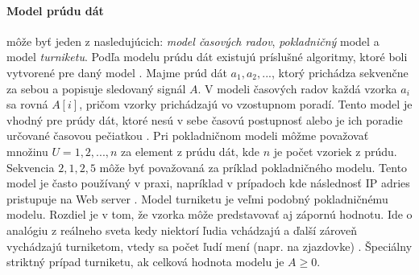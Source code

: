 \paragraph{Model prúdu dát} môže byť jeden z nasledujúcich: \textit{model časových radov}, \textit{pokladničný} model a model \textit{turniketu}. Podľa modelu prúdu dát existujú príslušné algoritmy, ktoré boli vytvorené pre daný model \citep{tran2014change}. Majme prúd dát $a_1, a_2, ...$, ktorý prichádza sekvenčne za sebou a popisuje sledovaný signál $A$. 
V modeli časových radov každá vzorka $a_i$ sa rovná $A[i]$, pričom vzorky prichádzajú vo vzostupnom poradí. Tento model je vhodný pre prúdy dát, ktoré nesú v sebe časovú postupnosť alebo je ich poradie určované časovou pečiatkou \citep{muthukrishnan2005data}.
Pri pokladničnom modeli môžme považovať množinu $U = {1, 2, ..., n}$ za element z prúdu dát, kde $n$ je počet vzoriek z prúdu. Sekvencia $2, 1, 2, 5$ môže byť považovaná za príklad pokladničného modelu. Tento model je často používaný v praxi, napríklad v prípadoch kde následnosť IP adries pristupuje na Web server \citep{ikonomovska2013algorithmic, muthukrishnan2005data}.
Model turniketu je veľmi podobný pokladničnému modelu. Rozdiel je v tom, že vzorka môže predstavovať aj zápornú hodnotu. Ide o analógiu z reálneho sveta kedy niektorí ľudia vchádzajú a ďalší zároveň vychádzajú turniketom, vtedy sa počet ľudí mení (napr. na zjazdovke) \citep{ikonomovska2013algorithmic, muthukrishnan2005data}. Špeciálny striktný prípad turniketu, ak celková hodnota modelu je $A \geq 0$.

